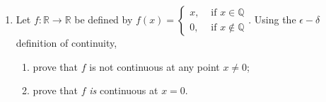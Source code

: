 \documentclass[12pt, letterpaper]{article}
\newcommand{\0}{\mathbf{0}}
\newcommand{\1}{\mathbf{1}}
\begin{document}
\begin{enumerate}
    \item 
    Let $f : \mathbb{R} \to \mathbb{R}$ be defined by $f(x) = \begin{cases} x, & \text{ if } x \in \mathbb{Q}\\ 0, &\text{ if } x \notin \mathbb{Q}\end{cases}.$ Using the $\epsilon-\delta$ definition of continuity,
    \begin{enumerate}
        \item 
        prove that $f$ is not continuous at any point $x \neq 0$;
        
        \item
        prove that $f$ \textit{is} continuous at $x = 0$.
        
    \end{enumerate}
    
\end{enumerate}
\end{document}
